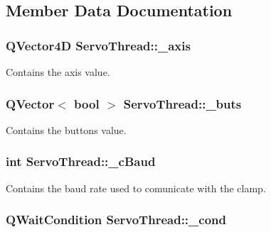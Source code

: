 \subsection{Member Data Documentation}
\hypertarget{a00009_a4ddc59272c23925f921e20ee630804c2}{}
\subsubsection[{\+\_\+axis}]{\setlength{\rightskip}{0pt plus 5cm}Q\+Vector4\+D Servo\+Thread\+::\+\_\+axis\hspace{0.3cm}{\ttfamily [private]}}\label{a00009_a4ddc59272c23925f921e20ee630804c2}


Contains the axis value. 

\hypertarget{a00009_a6f956f7e0f2953e213ff95fb64857ab0}{}
\subsubsection[{\+\_\+buts}]{\setlength{\rightskip}{0pt plus 5cm}Q\+Vector$<$ bool $>$ Servo\+Thread\+::\+\_\+buts\hspace{0.3cm}{\ttfamily [private]}}\label{a00009_a6f956f7e0f2953e213ff95fb64857ab0}


Contains the buttons value. 

\hypertarget{a00009_a9fccfd415e2e55c8abef7fcc6535af30}{}
\subsubsection[{\+\_\+c\+Baud}]{\setlength{\rightskip}{0pt plus 5cm}int Servo\+Thread\+::\+\_\+c\+Baud\hspace{0.3cm}{\ttfamily [private]}}\label{a00009_a9fccfd415e2e55c8abef7fcc6535af30}


Contains the baud rate used to comunicate with the clamp. 

\hypertarget{a00009_afcb93c09acd7fecf47d92996a297365c}{}
\subsubsection[{\+\_\+cond}]{\setlength{\rightskip}{0pt plus 5cm}Q\+Wait\+Condition Servo\+Thread\+::\+\_\+cond\hspace{0.3cm}{\ttfamily [private]}}\label{a00009_afcb93c09acd7fecf47d92996a297365c}


